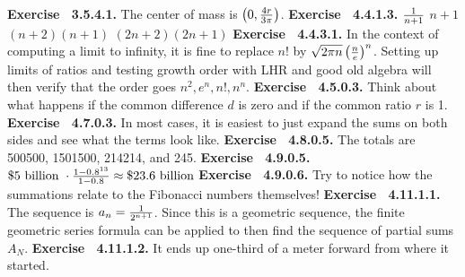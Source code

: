  {\noindent \protect \bf  Exercise ~3.5.4.1.} The center of mass is $\left ( 0, \protect \frac  {4r}{3\pi }\right )$. \protect \newline  \protect \newline  
 {\noindent \protect \bf  Exercise ~4.4.1.3.} \textbullet $\protect \frac  {1}{n+1}$ \textbullet $n+1$ \textbullet $(n+2)(n+1)$ \textbullet $(2n+2)(2n+1)$ \protect \newline  \protect \newline  
 {\noindent \protect \bf  Exercise ~4.4.3.1.} In the context of computing a limit to infinity, it is fine to replace $n!$ by $\protect \sqrt  {2\pi n} \left ( \protect \frac  {n}{e} \right )^n$. Setting up limits of ratios and testing growth order with LHR and good old algebra will then verify that the order goes $n^2,e^n,n!,n^n$. \protect \newline  \protect \newline  
 {\noindent \protect \bf  Exercise ~4.5.0.3.} Think about what happens if the common difference $d$ is zero and if the common ratio $r$ is 1. \protect \newline  \protect \newline  
 {\noindent \protect \bf  Exercise ~4.7.0.3.} In most cases, it is easiest to just expand the sums on both sides and see what the terms look like. \protect \newline  \protect \newline  
 {\noindent \protect \bf  Exercise ~4.8.0.5.} The totals are 500500, 1501500, 214214, and 245. \protect \newline  \protect \newline  
 {\noindent \protect \bf  Exercise ~4.9.0.5.} $\protect \$5 \protect \text  { billion }\cdot \protect \frac  {1-0.8^{13}}{1-0.8}\approx \protect \$23.6 \protect \text  { billion}$ \protect \newline  \protect \newline  
 {\noindent \protect \bf  Exercise ~4.9.0.6.} Try to notice how the summations relate to the Fibonacci numbers themselves! \protect \newline  \protect \newline  
 {\noindent \protect \bf  Exercise ~4.11.1.1.} The sequence is $a_n=\protect \frac  {1}{2^{n+1}}$. Since this is a geometric sequence, the finite geometric series formula can be applied to then find the sequence of partial sums $A_N$. \protect \newline  \protect \newline  
 {\noindent \protect \bf  Exercise ~4.11.1.2.} It ends up one-third of a meter forward from where it started. \protect \newline  \protect \newline  
